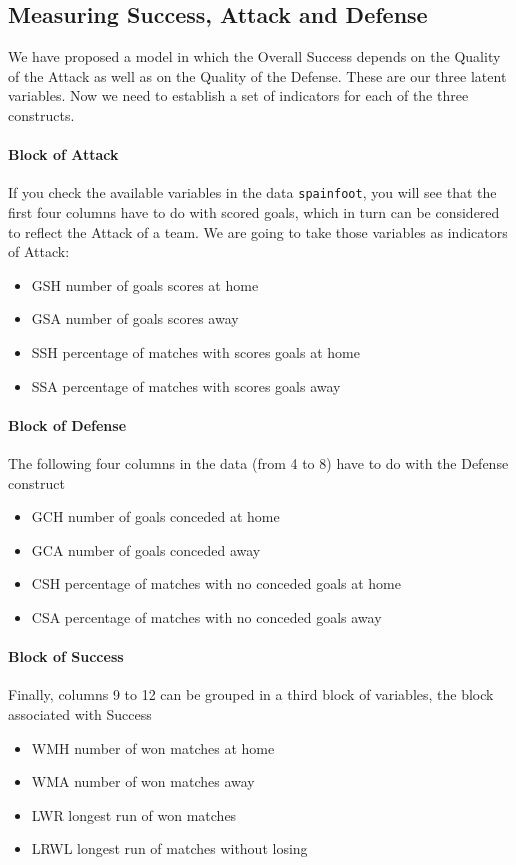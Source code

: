 \documentclass[12pt]{book}\usepackage{graphicx, color}
\newcommand{\code}[1]{\texttt{#1}}
\begin{document}
\subsection{Measuring Success, Attack and Defense}
We have proposed a model in which the Overall Success depends on the Quality of the Attack as well as on the Quality of the Defense. These are our three latent variables. Now we need to establish a set of indicators for each of the three constructs.

\paragraph{Block of Attack} If you check the available variables in the data \code{spainfoot}, you will see that the first four columns have to do with scored goals, which in turn can be considered to reflect the Attack of a team. We are going to take those variables as indicators of Attack:
\begin{itemize}
 \item GSH number of goals scores at home
 \item GSA number of goals scores away
 \item SSH percentage of matches with scores goals at home
 \item SSA percentage of matches with scores goals away
\end{itemize}

\paragraph{Block of Defense} The following four columns in the data (from 4 to 8) have to do with the Defense construct
\begin{itemize}
 \item GCH number of goals conceded at home
 \item GCA number of goals conceded away
 \item CSH percentage of matches with no conceded goals at home
 \item CSA percentage of matches with no conceded goals away
\end{itemize}

\paragraph{Block of Success} Finally, columns 9 to 12 can be grouped in a third block of variables, the block associated with Success
\begin{itemize}
 \item WMH number of won matches at home
 \item WMA number of won matches away
 \item LWR longest run of won matches
 \item LRWL longest run of matches without losing
\end{itemize}
\end{document}
